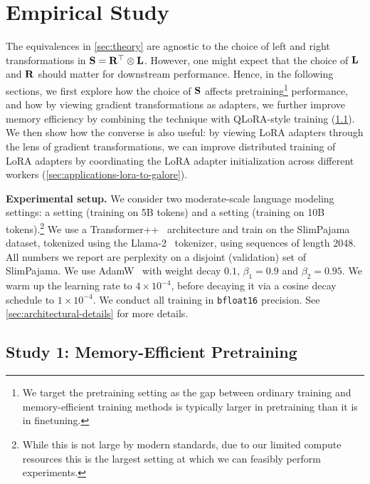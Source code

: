 \section{Empirical Study}


The equivalences in \cref{sec:theory} are agnostic to the choice of left and right transformations in ${\mathbf{S}} = {\mathbf{R}}^\top \otimes {\mathbf{L}}$.
However, one might expect that the choice of ${\mathbf{L}}$ and ${\mathbf{R}}$ should matter for downstream performance.
Hence, in the following sections, we first explore how the choice of  ${\mathbf{S}}$ affects pretraining\footnote{We target the pretraining setting as the gap between ordinary training and memory-efficient training methods is typically larger in pretraining than it is in finetuning.} performance, and how by viewing gradient transformations as adapters, we further improve  memory efficiency by combining the technique with QLoRA-style \citep{qlora} training (\cref{sec:applications-galore-to-lora}).
We then show how the converse is also useful: by viewing LoRA adapters through the lens of gradient transformations, we can improve distributed training of LoRA adapters by coordinating the LoRA adapter initialization across different workers (\cref{sec:applications-lora-to-galore}).



\noindent\textbf{Experimental setup.}
We consider two moderate-scale language modeling settings: a \tinyB setting (training on 5B tokens) and a \largeB setting (training on 10B tokens).\footnote{While this is not large by modern standards, due to our limited compute resources this is the largest setting at which we can feasibly perform experiments.}
We use a Transformer++~\citep{llama} architecture and train on the SlimPajama~\citep{slimpajama} dataset, tokenized using the Llama-2~\citep{llama2} tokenizer, using sequences of length 2048.
All numbers we report are perplexity on a disjoint (validation) set of SlimPajama.
We use AdamW~\citep{adamw} with weight decay $0.1$, $\beta_1 = 0.9$ and $\beta_2 = 0.95$.
We  warm up the learning rate to $4 \times 10^{-4}$, before decaying it via a cosine decay schedule to
$1 \times 10^{-4}$.
We conduct all training in \texttt{bfloat16} precision.
See \cref{sec:architectural-details} for more details.


\subsection{Study 1: Memory-Efficient Pretraining}

\label{sec:applications-galore-to-lora}



